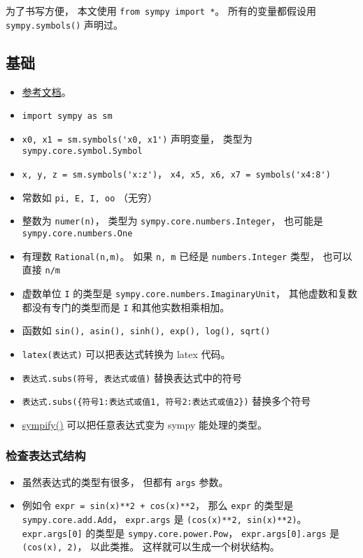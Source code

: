 
\begin{issues}
\issueDraft
\end{issues}


为了书写方便， 本文使用 \verb`from sympy import *`。 所有的变量都假设用 \verb`sympy.symbols()` 声明过。

\subsection{基础}
\begin{itemize}
\item \href{https://docs.sympy.org/latest/reference/index.html}{参考文档}。
\item \verb`import sympy as sm`
\item \verb`x0, x1 = sm.symbols('x0, x1')` 声明变量， 类型为 \verb`sympy.core.symbol.Symbol`
\item \verb`x, y, z = sm.symbols('x:z')`， \verb`x4, x5, x6, x7 = symbols('x4:8')`
\item 常数如 \verb`pi, E, I, oo` （无穷）
\item 整数为 \verb`numer(n)`， 类型为 \verb`sympy.core.numbers.Integer`， 也可能是 \verb`sympy.core.numbers.One`
\item 有理数 \verb`Rational(n,m)`。 如果 \verb`n, m` 已经是 \verb`numbers.Integer` 类型， 也可以直接 \verb`n/m`
\item 虚数单位 \verb`I` 的类型是 \verb`sympy.core.numbers.ImaginaryUnit`， 其他虚数和复数都没有专门的类型而是 \verb`I` 和其他实数相乘相加。
\item 函数如 \verb`sin(), asin(), sinh(), exp(), log(), sqrt()`
\item \verb`latex(表达式)` 可以把表达式转换为 latex 代码。
\item \verb`表达式.subs(符号, 表达式或值)` 替换表达式中的符号
\item \verb`表达式.subs({符号1:表达式或值1, 符号2:表达式或值2})` 替换多个符号
\item \href{https://docs.sympy.org/latest/modules/core.html}{sympify()} 可以把任意表达式变为 sympy 能处理的类型。
\end{itemize}

\subsubsection{检查表达式结构}
\begin{itemize}
\item 虽然表达式的类型有很多， 但都有 \verb`args` 参数。
\item 例如令 \verb`expr = sin(x)**2 + cos(x)**2`， 那么 \verb`expr` 的类型是 \verb`sympy.core.add.Add`， \verb`expr.args` 是 \verb`(cos(x)**2, sin(x)**2)`。 \verb`expr.args[0]` 的类型是 \verb`sympy.core.power.Pow`， \verb`expr.args[0].args` 是 \verb`(cos(x), 2)`， 以此类推。 这样就可以生成一个树状结构。
\end{itemize}

